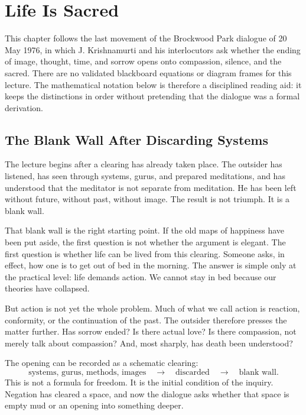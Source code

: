 \chapter{Life Is Sacred}

This chapter follows the last movement of the Brockwood Park dialogue of 20 May 1976, in which J. Krishnamurti and his interlocutors ask whether the ending of image, thought, time, and sorrow opens onto compassion, silence, and the sacred. There are no validated blackboard equations or diagram frames for this lecture. The mathematical notation below is therefore a disciplined reading aid: it keeps the distinctions in order without pretending that the dialogue was a formal derivation.

\section{The Blank Wall After Discarding Systems}

The lecture begins after a clearing has already taken place. The outsider has listened, has seen through systems, gurus, and prepared meditations, and has understood that the meditator is not separate from meditation. He has been left without future, without past, without image. The result is not triumph. It is a blank wall.

That blank wall is the right starting point. If the old maps of happiness have been put aside, the first question is not whether the argument is elegant. The first question is whether life can be lived from this clearing. Someone asks, in effect, how one is to get out of bed in the morning. The answer is simple only at the practical level: life demands action. We cannot stay in bed because our theories have collapsed.

But action is not yet the whole problem. Much of what we call action is reaction, conformity, or the continuation of the past. The outsider therefore presses the matter further. Has sorrow ended? Is there actual love? Is there compassion, not merely talk about compassion? And, most sharply, has death been understood?

The opening can be recorded as a schematic clearing:
\begin{equation}
\text{systems, gurus, methods, images}
\quad \longrightarrow \quad
\text{discarded}
\quad \longrightarrow \quad
\text{blank wall}.
\end{equation}
This is not a formula for freedom. It is the initial condition of the inquiry. Negation has cleared a space, and now the dialogue asks whether that space is empty mud or an opening into something deeper.

